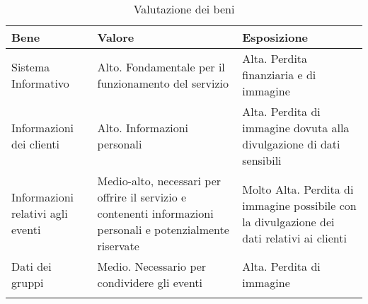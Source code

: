 \begin{longtable} {|P{3.5cm}|P{5.5cm}|P{6.7cm}|}
        \hline
        \textbf{Bene}                     & \textbf{Valore}                                                                                              & \textbf{Esposizione}      \\
        \hline
        Sistema Informativo               & Alto. Fondamentale per il funzionamento del servizio                                                         &
        Alta. Perdita finanziaria e di immagine                                                                                                                                      \\
        \hline
        Informazioni dei clienti          & Alto. Informazioni personali                                                                                 &
        Alta. Perdita di immagine dovuta alla divulgazione
        di dati sensibili                                                                                                                                                            \\
        \hline
        Informazioni relativi agli eventi & Medio-alto, necessari per offrire il servizio e contenenti informazioni personali e potenzialmente riservate &
        Molto Alta. Perdita di immagine possibile con la divulgazione dei dati relativi ai
        clienti                                                                                                                                                                      \\
        \hline
        Dati dei gruppi                   & Medio. Necessario per condividere gli eventi                                                                 & Alta. Perdita di immagine \\
        \hline
    \caption{Valutazione dei beni}
\end{longtable}

\clearpage

